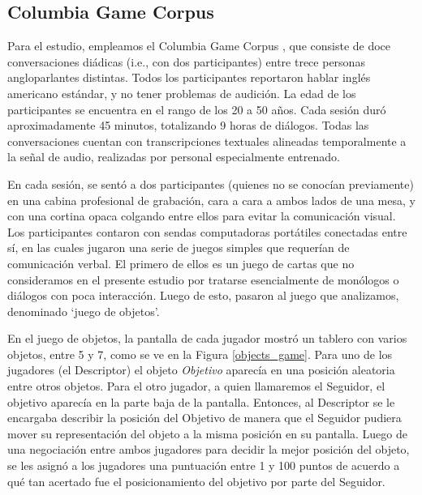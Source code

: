 \subsection{Columbia Game Corpus}

\newcommand{\objectgame} {\emph{Juego de objetos}}


Para el estudio, empleamos el Columbia Game Corpus  \cite{GRAV2009}, que consiste de doce conversaciones diádicas (i.e., con dos participantes) entre trece personas angloparlantes distintas. Todos los participantes reportaron hablar inglés americano estándar, y no tener problemas de audición. La edad de los participantes se encuentra en el rango de los 20 a 50 años. Cada sesión duró aproximadamente 45 minutos, totalizando 9 horas de diálogos. Todas las conversaciones cuentan con transcripciones textuales alineadas temporalmente a la señal de audio, realizadas por personal especialmente entrenado.

En cada sesión, se sentó a dos participantes (quienes no se conocían previamente) en una cabina profesional de grabación, cara a cara a ambos lados de una mesa, y con una cortina opaca colgando entre ellos para evitar la comunicación visual. Los participantes contaron con sendas computadoras portátiles conectadas entre sí, en las cuales jugaron una serie de juegos simples que requerían de comunicación verbal. El primero de ellos es un juego de cartas que no consideramos en el presente estudio por tratarse esencialmente de monólogos o diálogos con poca interacción. Luego de esto, pasaron al juego que analizamos, denominado `juego de objetos'.

En el juego de objetos, la pantalla de cada jugador mostró un tablero con varios objetos, entre 5 y 7, como se ve en la Figura \ref{objects_game}.
Para uno de los jugadores (el Descriptor) el objeto \emph{Objetivo} aparecía en una posición aleatoria entre otros objetos. Para el otro jugador, a quien llamaremos el Seguidor, el objetivo aparecía en la parte baja de la pantalla. Entonces, al Descriptor se le encargaba describir la posición del Objetivo de manera que el Seguidor pudiera mover su representación del objeto a la misma posición en su pantalla. Luego de una negociación entre ambos jugadores para decidir la mejor posición del objeto, se les asignó a los jugadores una puntuación entre 1 y 100 puntos de acuerdo a qué tan acertado fue el posicionamiento del objetivo por parte del Seguidor.

